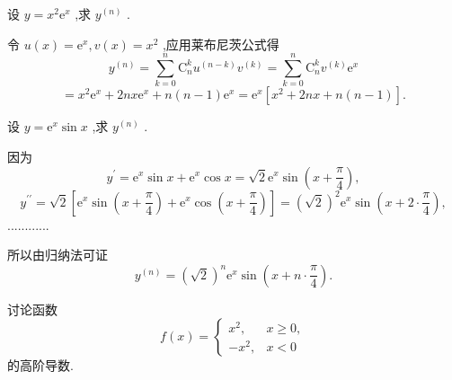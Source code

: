 \begin{example}
设 \(y = {x}^{2}{\mathrm{e}}^{x}\) ,求 \({y}^{\left( n\right) }\) .
\end{example}


\begin{solution}
令 \(u\left( x\right)  = {\mathrm{e}}^{x},v\left( x\right)  = {x}^{2}\) ,应用莱布尼茨公式得
\[
{y}^{\left( n\right) } = \mathop{\sum }\limits_{{k = 0}}^{n}{\mathrm{C}}_{n}^{k}{u}^{\left( n - k\right) }{v}^{\left( k\right) } = \mathop{\sum }\limits_{{k = 0}}^{n}{\mathrm{C}}_{n}^{k}{v}^{\left( k\right) }{\mathrm{e}}^{x}
\]
\[
= {x}^{2}{\mathrm{e}}^{x} + {2nx}{\mathrm{e}}^{x} + n\left( {n - 1}\right) {\mathrm{e}}^{x} = {\mathrm{e}}^{x}\left\lbrack  {{x}^{2} + {2nx} + n\left( {n - 1}\right) }\right\rbrack  .
\]
\end{solution}

\begin{example}
设 \(y = {\mathrm{e}}^{x}\sin x\) ,求 \({y}^{\left( n\right) }\) .
\end{example}


\begin{solution}
因为
\[
{y}^{\prime } = {\mathrm{e}}^{x}\sin x + {\mathrm{e}}^{x}\cos x = \sqrt{2}{\mathrm{e}}^{x}\sin \left( {x + \frac{\pi }{4}}\right) ,
\]
\[
{y}^{\prime \prime } = \sqrt{2}\left\lbrack  {{\mathrm{e}}^{x}\sin \left( {x + \frac{\pi }{4}}\right)  + {\mathrm{e}}^{x}\cos \left( {x + \frac{\pi }{4}}\right) }\right\rbrack   = {\left( \sqrt{2}\right) }^{2}{\mathrm{e}}^{x}\sin \left( {x + 2 \cdot  \frac{\pi }{4}}\right) ,
\]
............

所以由归纳法可证
\[
{y}^{\left( n\right) } = {\left( \sqrt{2}\right) }^{n}{\mathrm{e}}^{x}\sin \left( {x + n \cdot  \frac{\pi }{4}}\right) .
\]
\end{solution}

\begin{example}
讨论函数
\[
f\left( x\right)  = \left\{  \begin{matrix} {x}^{2}, & x \geq  0, \\   - {x}^{2}, & x < 0 \end{matrix}\right.
\]
的高阶导数.
\end{example}


